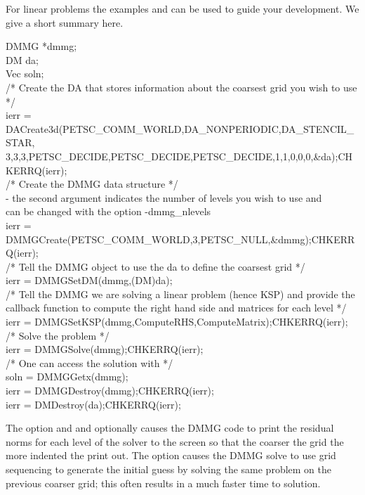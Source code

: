 For linear problems the examples  and  can be used
to guide your development. We give a short summary here.
\begin{tabbing}
  DMMG        *dmmg;\\
  DM          da;\\
  Vec         soln;\\

  /* Create the DA that stores information about the coarsest grid you wish to use */\\
  ierr = DACreate3d(PETSC_COMM_WORLD,DA\_NONPERIODIC,DA_STENCIL_STAR,\\
         3,3,3,PETSC_DECIDE,PETSC_DECIDE,PETSC_DECIDE,1,1,0,0,0,\&da);CHKERRQ(ierr);\\

  /* Create the DMMG data structure */\\
       - the second argument indicates the number of levels you wish to use and \\
         can be changed with the option -dmmg\_nlevels \\
  ierr = DMMGCreate(PETSC_COMM_WORLD,3,PETSC_NULL,\&dmmg);CHKERRQ(ierr);\\

  /*  Tell the DMMG object to use the da to define the coarsest grid */\\
  ierr = DMMGSetDM(dmmg,(DM)da);\\

  /*  Tell the DMMG we are solving a linear problem (hence KSP) and provide the \\
      callback function to compute the right hand side and matrices for each level */\\
  ierr = DMMGSetKSP(dmmg,ComputeRHS,ComputeMatrix);CHKERRQ(ierr);\\

  /*  Solve the problem */\\
  ierr = DMMGSolve(dmmg);CHKERRQ(ierr);\\

  /*  One can access the solution with */\\
  soln = DMMGGetx(dmmg);\\

  ierr = DMMGDestroy(dmmg);CHKERRQ(ierr);\\
  ierr = DMDestroy(da);CHKERRQ(ierr);\\
\end{tabbing}
The option   and  and optionally  
 causes the DMMG code to print the residual norms for each level of the solver to the screen so that
the coarser the grid the more indented the print out. The option   causes the 
DMMG solve to use grid sequencing to generate the initial guess by solving the same problem on the previous coarser grid; this often
results in a much faster time to solution.

